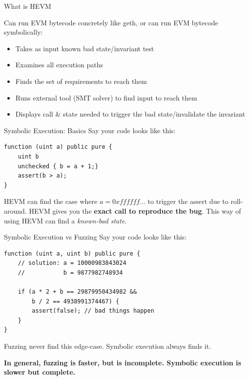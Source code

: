 \documentclass{beamer}
\begin{document}
\begin{frame}{What is HEVM}

Can run EVM bytecode concretely like geth, or can run EVM bytecode symbolically:
\begin{itemize}
\item Takes as input known bad state/invariant test
\item Examines all execution paths
\item Finds the set of requirements to reach them
\item Runs external tool (SMT solver) to find input to reach them
\item Displays call \& state needed to trigger the bad state/invalidate the invariant
\end{itemize}
\end{frame}

\begin{frame}[fragile=singleslide]{Symbolic Execution: Basics}
Say your code looks like this:
\begin{Verbatim}[frame=single, framerule=0.2mm, framesep=2mm,fontsize=\small]
function (uint a) public pure {
	uint b
	unchecked { b = a + 1;}
	assert(b > a);
}
\end{Verbatim}


HEVM can find the case where $a=0xffffff\ldots$ to trigger the assert due to roll-around. HEVM gives you the \textbf{exact call to reproduce the bug}. This way of using HEVM can find a \emph{known-bad state}.

\end{frame}

\begin{frame}[fragile=singleslide]{Symbolic Execution vs Fuzzing}
Say your code looks like this:

\begin{Verbatim}[frame=single, framerule=0.2mm, framesep=2mm,fontsize=\small]
function (uint a, uint b) public pure {	
	// solution: a = 10000983843024
	//           b = 9877982748934
	
	if (a * 2 + b == 29879950434982 &&
	    b / 2 == 4938991374467) {
		assert(false); // bad things happen
	}
}
\end{Verbatim}

Fuzzing never find this edge-case. Symbolic execution always finds it.
\bigskip 

\textbf{In general, fuzzing is faster, but is incomplete. Symbolic execution is slower but complete.}

\end{frame}
\end{document}
